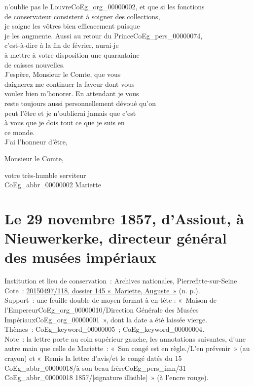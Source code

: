 \documentclass{book}
\begin{document}
{n’oublie pas le Louvre\gls{CoEg_org_00000002}, et que si les fonctions\\
de conservateur consistent à soigner des collections,\\
je soigne les vôtres bien efficacement puisque\\
je les augmente. Aussi au retour du Prince\gls{CoEg_pers_00000074},\\
c’est-à-dire à la fin de février, aurai-je\\
à mettre à votre disposition une quarantaine\\
de caisses nouvelles.\\
\indent J’espère, Monsieur le Comte, que vous\\
daignerez me continuer la faveur dont vous\\
voulez bien m’honorer. En attendant je vous\\
reste toujours aussi personnellement dévoué qu’on\\
peut l’être et je n’oublierai jamais que c’est\\
à vous que je dois tout ce que je suis en\\
ce monde.\\
\indent J’ai l’honneur d’être,
\begin{center}Monsieur le Comte,\end{center}
\begin{center}\hspace{5cm}votre très-humble serviteur\\
\hspace{5cm} \gls{CoEg_abbr_00000002} Mariette\end{center}
\hypertarget{CoEg_Mariette_1857-11-29}{}
\section*{Le 29 novembre 1857, d’Assiout, à Nieuwerkerke, directeur général des musées impériaux}  
{\footnotesize
\noindent Institution et lieu de conservation~: Archives nationales, Pierrefitte-sur-Seine\\
Cote~: \hyperlink{CoEg_Mariette_ms_001}{20150497/118, dossier 145 «~Mariette, Auguste~»} (n. p.).\\
Support~: une feuille double de moyen format à en-tête : «~Maison de l'Empereur\gls{CoEg_org_00000010}/Direction Générale des Musées Impériaux\gls{CoEg_org_00000001}~», dont la date a été laissée vierge.\\
Thèmes~: \gls{CoEg_keyword_00000005}~; \gls{CoEg_keyword_00000004}.\\
Note~: la lettre porte au coin supérieur gauche, les annotations suivantes, d’une autre main que celle de Mariette~: «~Son congé est en règle./L’en prévenir~» (au crayon) et «~Remis la lettre d’avis/et le congé datés du 15 \gls{CoEg_abbr_00000018}/à son beau frère\gls{CoEg_pers_imn}/31 \gls{CoEg_abbr_00000018} 1857/{[signature illisible]}~» (à l'encre rouge).

}}
\end{document}

